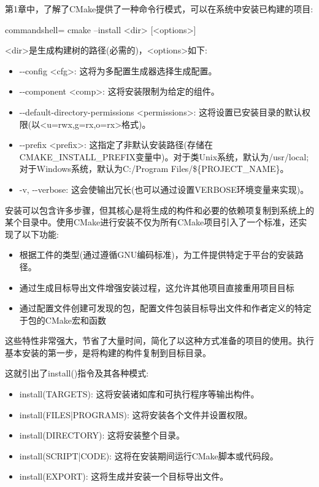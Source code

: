 
第1章中，了解了CMake提供了一种命令行模式，可以在系统中安装已构建的项目:

\begin{tcblisting}{commandshell={}}
cmake --install <dir> [<options>]
\end{tcblisting}

<dir>是生成构建树的路径(必需的)，<options>如下:

\begin{itemize}
\item 
-{}-config <cfg>: 这将为多配置生成器选择生成配置。

\item 
-{}-component <comp>: 这将安装限制为给定的组件。

\item 
-{}-default-directory-permissions <permissions>: 这将设置已安装目录的默认权限(以<u=rwx,g=rx,o=rx>格式)。

\item 
-{}-prefix <prefix>: 这指定了非默认安装路径(存储在CMAKE\_INSTALL\_PREFIX变量中)。对于类Unix系统，默认为/usr/local;对于Windows系统，默认为C:/Program Files/\$\{PROJECT\_NAME\}。

\item 
-v, -{}-verbose: 这会使输出冗长(也可以通过设置VERBOSE环境变量来实现)。
\end{itemize}

安装可以包含许多步骤，但其核心是将生成的构件和必要的依赖项复制到系统上的某个目录中。使用CMake进行安装不仅为所有CMake项目引入了一个标准，还实现了以下功能:

\begin{itemize}
\item 
根据工件的类型(通过遵循GNU编码标准)，为工件提供特定于平台的安装路径。

\item 
通过生成目标导出文件增强安装过程，这允许其他项目直接重用项目目标

\item 
通过配置文件创建可发现的包，配置文件包装目标导出文件和作者定义的特定于包的CMake宏和函数
\end{itemize}

这些特性非常强大，节省了大量时间，简化了以这种方式准备的项目的使用。执行基本安装的第一步，是将构建的构件复制到目标目录。

这就引出了install()指令及其各种模式:

\begin{itemize}
\item 
install(TARGETS): 这将安装诸如库和可执行程序等输出构件。

\item 
install(FILES|PROGRAMS): 这将安装各个文件并设置权限。

\item 
install(DIRECTORY): 这将安装整个目录。

\item 
install(SCRIPT|CODE): 这将在安装期间运行CMake脚本或代码段。

\item 
install(EXPORT): 这将生成并安装一个目标导出文件。
\end{itemize}

